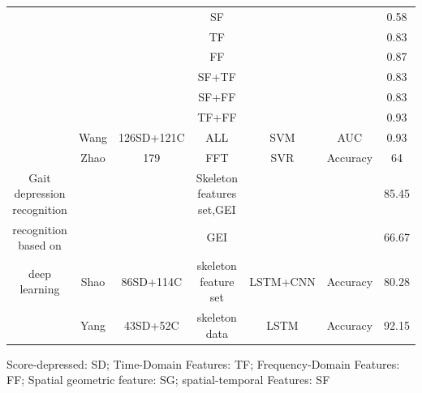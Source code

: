 \begin{table}[!htbp]
{\begin{threeparttable}
\begin{tabular}{c|cccccc}
& & & SF & & & 0.58\\
& & & TF & & & 0.83 \\
& & & FF & & & 0.87 \\
& & & SF+TF & & & 0.83\\
& & & SF+FF & & & 0.83   \\
& & & TF+FF& & & 0.93  \\
& \multirow{-7}{*}{Wang\cite{wang2021detecting}}&\multirow{-7}{*}{126SD+121C}&ALL&\multirow{-7}{*}{SVM}&\multirow{-7}{*}{AUC} & 0.93 \\ \cline{2-7}
& Zhao\cite{zhao2019see} & 179 & FFT & SVR & Accuracy & 64  \\ \midrule
Gait depression recognition &  & & Skeleton features set,GEI  &  &  & 85.45\\
recognition based on & &  & GEI & &  & 66.67   \\
deep learning& \multirow{-3}{*}{Shao\cite{shao2021multi}}& \multirow{-3}{*}{86SD+114C}  & skeleton feature set                       & \multirow{-3}{*}{LSTM+CNN} & \multirow{-3}{*}{Accuracy} & 80.28 \\ \cline{2-7}
& Yang\cite{yang2022data} & 43SD+52C & skeleton data & LSTM & Accuracy  & 92.15  \\ \bottomrule
\end{tabular}
      \begin{tablenotes}
		\item Score-depressed: SD; Time-Domain Features: TF; Frequency-Domain Features: FF; Spatial geometric feature: SG; spatial-temporal Features: SF
     \end{tablenotes}
\end{threeparttable}}
\end{table}



\ifx\allfiles\undefined

\fi
